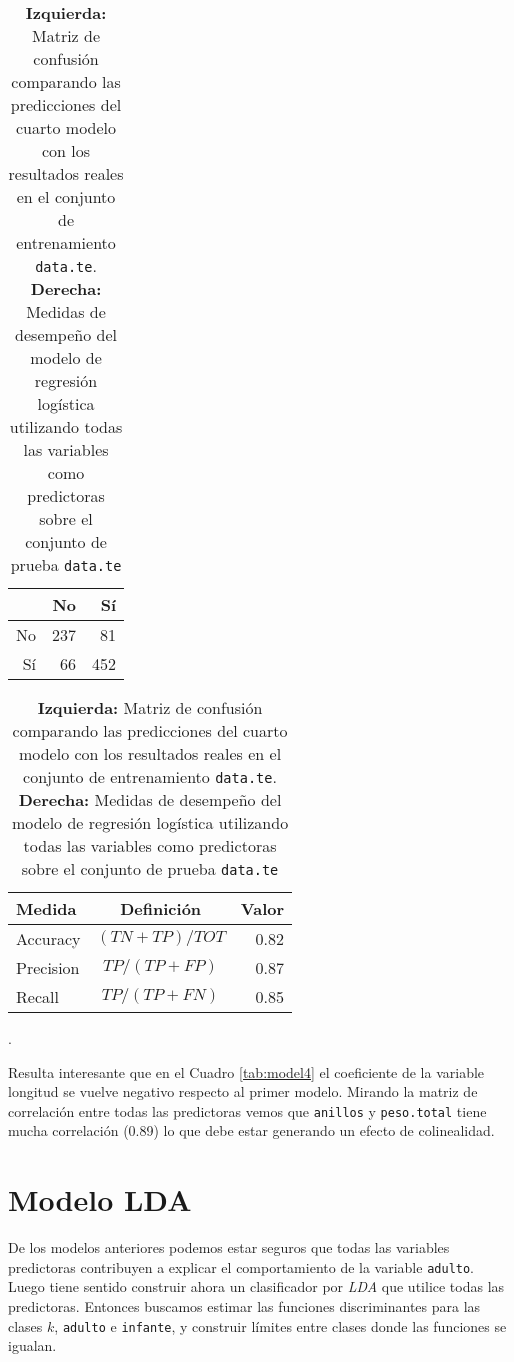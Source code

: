 \documentclass[a4paper]{article}\usepackage[]{graphicx}\usepackage[]{color}
\begin{document}
\begin{table}[ht]
\centering
\begin{tabular}{rrr}
  \hline
 & No & Sí \\ 
  \hline
No & 237 &  81 \\ 
  Sí &  66 & 452 \\ 
   \hline
\end{tabular}
\hspace{4cm}
\begin{tabular}{l c r}
\hline
Medida 				& Definición		& Valor\\
\hline
Accuracy 			& $(TN+TP)/TOT$ & 0.82\\
Precision 			& $TP/(TP+FP)$  &  0.87\\
Recall 				& $TP/(TP+FN)$  & 0.85\\
\hline
\end{tabular}
\caption{\textbf{Izquierda:} Matriz de confusión comparando las predicciones del cuarto modelo con los resultados reales en el conjunto de entrenamiento \texttt{\textcolor{BurntOrange}{data.te}}. \textbf{Derecha:} Medidas de desempeño del modelo de regresión logística utilizando todas las variables como predictoras sobre el conjunto de prueba \texttt{\textcolor{BurntOrange}{data.te}}}.
\label{tab:medidas4}
\end{table}

Resulta interesante que en el Cuadro \ref{tab:model4} el coeficiente de la variable longitud se vuelve negativo respecto al primer modelo. Mirando la matriz de correlación entre todas las predictoras vemos que \texttt{\textcolor{BurntOrange}{anillos}} y \texttt{\textcolor{BurntOrange}{peso.total}} tiene mucha correlación (0.89) lo que debe estar generando un efecto de colinealidad.


\vspace{5cm}

\section{Modelo LDA}
 De los modelos anteriores podemos estar seguros que todas las variables predictoras contribuyen a explicar el comportamiento de la variable \texttt{\textcolor{BurntOrange}{adulto}}. Luego tiene sentido construir ahora un clasificador por \textit{LDA} que utilice todas las predictoras. Entonces buscamos estimar las funciones discriminantes para las clases $k$, \texttt{\textcolor{BurntOrange}{adulto}} e \texttt{\textcolor{BurntOrange}{infante}}, y construir límites entre clases donde las funciones se igualan. 
\end{document}
